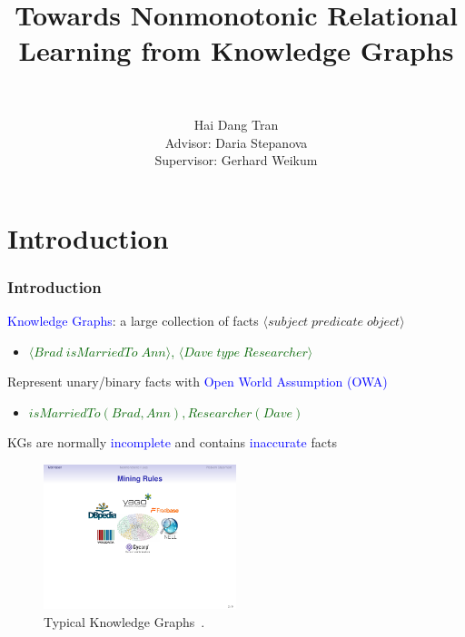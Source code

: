 \documentclass{beamer}
\title{Towards Nonmonotonic Relational Learning from Knowledge Graphs}
\author[Stepanova]
 {
   \large{}\\
 }
\author[shortname]{Hai Dang Tran\\Advisor: Daria Stepanova\\Supervisor: Gerhard Weikum}
\institute[shortinst]{Max Planck Institute for Informatics\\
                      Saarland University, Saarbr\"{u}cken, Germany}
\date[]{}
\newcommand{\tuple}[1]{\ensuremath{\langle#1\rangle}}
\newcommand{\bl}[1]{\textcolor{blue}{#1}}
\newcommand{\gr}[1]{\textcolor{darkgreen}{#1}}
\newcommand{\mi}[1]{\ensuremath{\mathit{#1}}}
\begin{document}
\frame{\titlepage}
\addtocounter{framenumber}{-1}


\section{Introduction}
\begin{frame}\frametitle{Introduction}
\medskip
\begin{itemize}
\small{\item \textcolor{blue}{Knowledge Graphs}: a large collection of facts $\tuple{subject\;predicate\;object}$
\begin{itemize}
\item[] \gr{$\tuple{\mi{Brad\;isMarriedTo\;Ann}}$, $\tuple{\mi{Dave \;type\;Researcher}}$}
\end{itemize}
\bigskip

\item Represent unary/binary facts with \textcolor{blue}{Open World Assumption (OWA)}
\begin{itemize}
\item[] \gr{$\mi{isMarriedTo(Brad,Ann), Researcher(Dave)}$}
\end{itemize}
\bigskip

\item KGs are normally \bl{incomplete} and contains \bl{inaccurate} facts
}
\end{itemize}

\begin{figure}[ht]
\includegraphics[width=0.5\textwidth]{kb}
\caption{Typical Knowledge Graphs~\cite{rumis}.}
\end{figure}


\end{frame}
\end{document}
